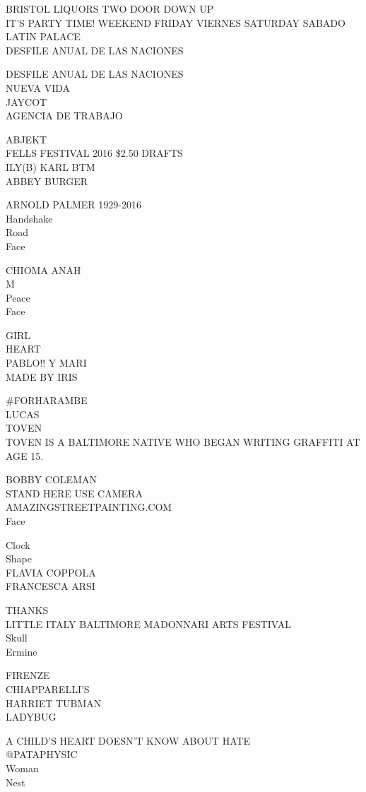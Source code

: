\documentclass[10pt,letterpaper]{article}
\begin{document}
BRISTOL LIQUORS TWO DOOR DOWN UP\\
IT'S PARTY TIME!  WEEKEND FRIDAY VIERNES SATURDAY SABADO\\
LATIN PALACE\\
DESFILE ANUAL DE LAS NACIONES

DESFILE ANUAL DE LAS NACIONES\\
NUEVA VIDA\\
JAYCOT\\
AGENCIA DE TRABAJO

ABJEKT\\
FELLS FESTIVAL 2016 \$2.50 DRAFTS\\
ILY(B) KARL BTM\\
ABBEY BURGER

ARNOLD PALMER 1929{-}2016\\
Handshake\\
Road\\
Face

CHIOMA ANAH\\
M\\
Peace\\
Face

GIRL\\
HEART\\
PABLO!! Y MARI\\
MADE BY IRIS

\#FORHARAMBE\\
LUCAS\\
TOVEN\\
TOVEN IS A BALTIMORE NATIVE WHO BEGAN WRITING GRAFFITI AT AGE 15.

BOBBY COLEMAN\\
STAND HERE USE CAMERA\\
AMAZINGSTREETPAINTING.COM\\
Face

Clock\\
Shape\\
FLAVIA COPPOLA\\
FRANCESCA ARSI

THANKS\\
LITTLE ITALY BALTIMORE MADONNARI ARTS FESTIVAL\\
Skull\\
Ermine

FIRENZE\\
CHIAPPARELLI'S\\
HARRIET TUBMAN\\
LADYBUG

A CHILD'S HEART DOESN'T KNOW ABOUT HATE\\
@PATAPHYSIC\\
Woman\\
Nest
\end{document}
